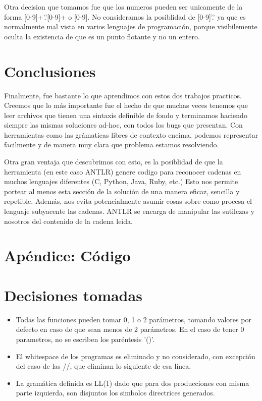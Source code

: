 \documentclass[a4paper]{article}
\begin{document}
Otra decision que tomamos fue que los numeros pueden ser unicamente de la forma
[0-9]+'.'[0-9]+ o [0-9]. No consideramos  la posiblidad de [0-9]'.' ya que es
normalmente mal vista en varios lenguajes de programaci\'on, porque visibilemente
oculta la existencia de que es un punto flotante y no un entero.


\section{Conclusiones}
Finalmente, fue bastante lo que aprendimos con estos dos trabajos practicos.
Creemos que lo m\'as importante fue el hecho de que muchas veces tenemos que
leer archivos que tienen una sintaxis definible de fondo y terminamos haciendo
siempre las mismas soluciones ad-hoc, con todos los bugs que presentan. Con
herramientas como las gr\'amaticas libres de contexto encima, podemos representar
facilmente y de manera muy clara que problema estamos resolviendo.

Otra gran ventaja que descubrimos con esto, es la posiblidad de que la herramienta
(en este caso ANTLR) genere codigo para reconocer cadenas en muchos lenguajes
diferentes (C, Python, Java, Ruby, etc.) Esto nos permite portear al menos 
esta secci\'on de la soluci\'on de una manera eficaz, sencilla y repetible. 
Adem\'as, nos evita potencialmente asumir cosas sobre como procesa el lenguaje
subyacente las cadenas. ANTLR se encarga de manipular las sutilezas y nosotros
del contenido de la cadena leida.


\section{Ap\'endice: C\'odigo}



\section{Decisiones tomadas}
\begin{itemize}
\item Todas las funciones  pueden tomar 0, 1 o 2 parámetros, tomando valores por defecto en caso de que sean menos de 2 parámetros. En el caso de tener 0 parametros, no se escriben los paréntesis '()'.

\item El whitespace de los programas es eliminado y no considerado, con excepción del caso de las //, que eliminan lo siguiente de esa línea.

\item La gramática definida es LL(1) dado que para dos producciones con misma parte izquierda, son disjuntos los simbolos directrices generados.
\end{itemize}
\end{document}
